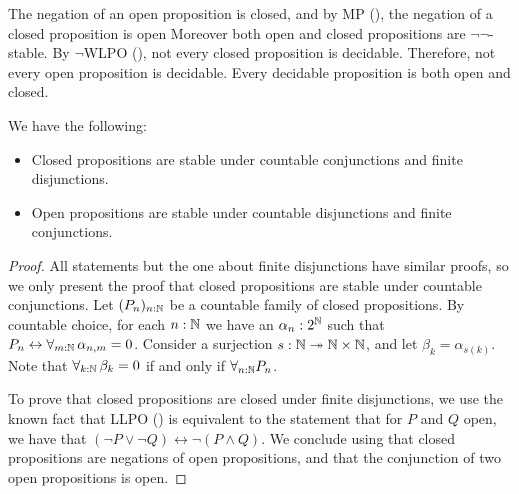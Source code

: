 \begin{remark}\label{rmkOpenClosedNegation}
  The negation of an open proposition is closed, 
  and by MP (), the negation of a closed proposition is open %
  Moreover both open and closed propositions are $\neg\neg$-stable. 
  By $\neg$WLPO (), 
  not every closed proposition is decidable. 
  Therefore, not every open proposition is decidable. 
  Every decidable proposition is both open and closed.
\end{remark}
\begin{lemma}
  We have the following:
  \begin{itemize}
    \item Closed propositions are stable under countable conjunctions and finite disjunctions. 
    \item Open propositions are stable under countable disjunctions and finite conjunctions. 
  \end{itemize}
\end{lemma}
\begin{proof}
  All statements but the one about finite disjunctions have similar proofs, so we only present the proof that closed propositions are stable under countable conjunctions. 
  Let $(P_n)_{n:\mathbb{N}}$ be a countable family of closed propositions. 
  By countable choice, for each 
  $n:\mathbb{N}$ we have an $\alpha_n:2^{\mathbb{N}}$ 
  such that $P_n \leftrightarrow \forall_{m:\mathbb{N}}\, \alpha_{n,m} =0$. 
  Consider a surjection $s:\mathbb{N} \twoheadrightarrow \mathbb{N} \times \mathbb{N}$, and let 
  $\beta_k = \alpha_{s(k)}.$
  Note that $\forall_{k:\mathbb{N}}\, \beta_k = 0$ if and only if 
  $\forall_{n:\mathbb{N}} P_n$. 

To prove that closed propositions are closed under finite disjunctions, we use the known fact that LLPO () is equivalent to the statement that for $P$ and $Q$ open, we have that $(\neg P \vee \neg Q) \leftrightarrow \neg (P\wedge Q)$. We conclude using that closed propositions are negations of open propositions, and that the conjunction of two open propositions is open.
\end{proof}

